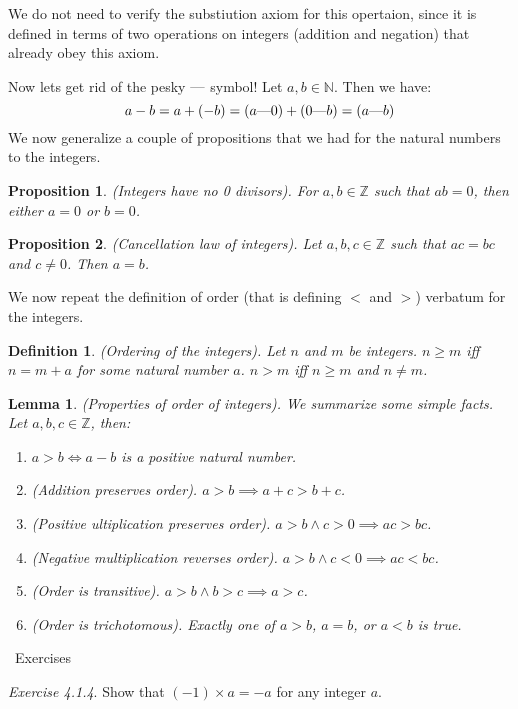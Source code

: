 \documentclass{article}
\newtheorem{definition}{Definition}[subsection]
\newtheorem{proposition}{Proposition}[subsection]
\newtheorem{lemma}{Lemma}[subsection]
\newcommand{\Z}{\mathbb{Z}}
\newcommand{\N}{\mathbb{N}}
\newcommand{\exercisesline}{	%
    \begin{center}
    \textemdash\ Exercises\ \textemdash
    \end{center}
}
\newcommand{\mem}{\text{\textemdash}} %
\let\it\textit
\begin{document}
We do not need to verify the substiution axiom for this opertaion,
since it is defined in terms of two operations on integers 
(addition and negation) that already obey this axiom.

Now lets get rid of the pesky $\mem$ symbol! Let $a,b \in \N$. Then 
we have: 
$$
a - b = a + (-b) = (a \mem 0) + (0 \mem b) = (a \mem b)
$$
We now generalize a couple of propositions that we had for the natural 
numbers to the integers.
\begin{proposition}
	(Integers have no 0 divisors). For $a,b \in \Z$ such 
	that $ab = 0$, then either $a = 0$ or $b = 0$.
\end{proposition}

\begin{proposition}
	(Cancellation law of integers). Let $a,b,c \in \Z$ such that
	$ac = bc$ and $c \neq 0$. Then $a = b$.
\end{proposition}

We now repeat the definition of order (that is defining $<$ and $>$) 
verbatum for the integers.

\begin{definition}
	(Ordering of the integers). Let $n$ and $m$ be integers. 
	$n \geq m$ iff $n = m + a$ for some natural number $a$.
	$n > m$ iff $n \geq m$ and $n \neq m$. 
\end{definition}

\begin{lemma}
	(Properties of order of integers). We summarize some simple 
	facts. Let $a,b,c \in \Z$, then:
	\begin{enumerate}
		\item $a > b \iff a -b$ is a positive natural number.
		\item (Addition preserves order). $a > b \implies a + c > b + c$.
		\item (Positive ultiplication preserves order). 
			$a > b \land c > 0 \implies ac > bc$.
		\item  (Negative multiplication reverses order). 
			$a > b \land c < 0 \implies ac < bc$.
		\item (Order is transitive). $a > b \land b > c \implies a > c$.
		\item (Order is trichotomous). Exactly one of $a > b$, $a = b$, 
			or $a < b$ is true.
	\end{enumerate}
\end{lemma}

\exercisesline

\it{Exercise 4.1.4}. Show that $(-1) \times a = -a$ for any integer $a$.
\end{document}
